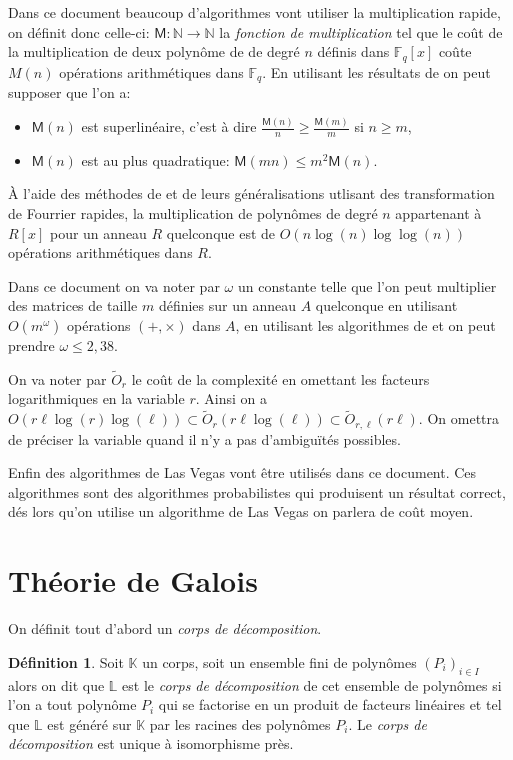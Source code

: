 \documentclass[10pt,a4paper]{book}
\theoremstyle{plain}
\theoremstyle{definition}
\theoremstyle{definition}
\theoremstyle{definition}
\theoremstyle{definition}
\newtheorem{defi}[thm]{Définition}
\theoremstyle{remark}
\theoremstyle{remark}
\theoremstyle{definition}
\begin{document}
Dans ce document beaucoup d'algorithmes vont utiliser la multiplication rapide, on définit donc celle-ci: $\mathsf{M}:\mathbb{N} \rightarrow \mathbb{N}$ la \emph{fonction de multiplication} tel que le coût de la multiplication de deux polynôme de de degré $n$ définis dans $\mathbb{F}_q[x]$ coûte $M(n)$ opérations arithmétiques dans $\mathbb{F}_q$. En utilisant les résultats de \cite[§8.3]{vzGJG03} on peut supposer que l'on a:
\begin{itemize}
\item $\mathsf{M}(n)$ est superlinéaire, c'est à dire $\frac{\mathsf{M}(n)}{n} \geqslant \frac{\mathsf{M}(m)}{m}$ si $n \geqslant m$,
\item $\mathsf{M}(n)$ est au plus quadratique: $\mathsf{M}(mn) \leqslant m^2 \mathsf{M}(n)$.
\end{itemize} 

\`A l'aide des méthodes de \cite{SchonhageStrassen71} et de leurs généralisations  \cite{Schonhage77} \cite{Cantor-Kaltofen91} utlisant des transformation de Fourrier rapides, la multiplication de polynômes de degré $n$ appartenant à $R[x]$ pour un anneau $R$ quelconque est de $O(n\log(n) \log \log (n))$ opérations arithmétiques dans $R$.

Dans ce document on va noter par $\omega$ un constante telle que l'on peut 
multiplier des matrices de taille $m$ définies sur un anneau $A$ quelconque en
utilisant $O(m^{\omega})$ opérations $(+,\times)$ dans $A$, en utilisant les 
algorithmes de \cite{CoppersmithWinograd90} et \cite{Williams12} on peut 
prendre $\omega \leqslant 2,38$.

On va noter par $\tilde{O}_{r}$ le coût de la complexité en omettant les facteurs 
logarithmiques en la variable $r$. Ainsi on a $O(r \ell \log(r) \log(\ell)) 
\subset \tilde{O}_{r}(r \ell \log(\ell)) \subset \tilde{O}_{r,\ell}(r \ell)$. 
On omettra de préciser la variable quand il n'y a pas d'ambiguïtés possibles.

Enfin des algorithmes de Las Vegas vont être utilisés dans ce document. Ces algorithmes sont des algorithmes probabilistes qui produisent un résultat correct, dés lors qu'on utilise un algorithme de Las Vegas on parlera de coût moyen. 


\section{Théorie de Galois}

On définit tout d'abord un \emph{corps de décomposition}.
\begin{defi}
Soit $\mathbb{K}$ un corps, soit un ensemble fini de polynômes 
$(P_i)_{i \in I}$ alors on dit que $\mathbb{L}$ est le 
\emph{corps de décomposition} de cet ensemble de polynômes si l'on a tout polynôme
 $P_i$ qui se factorise en un produit de facteurs linéaires et tel que 
 $\mathbb{L}$ est généré sur $\mathbb{K}$ par les racines des polynômes $P_i$.
 Le \emph{corps de décomposition} est unique à isomorphisme près. 
\end{defi}
\end{document}
